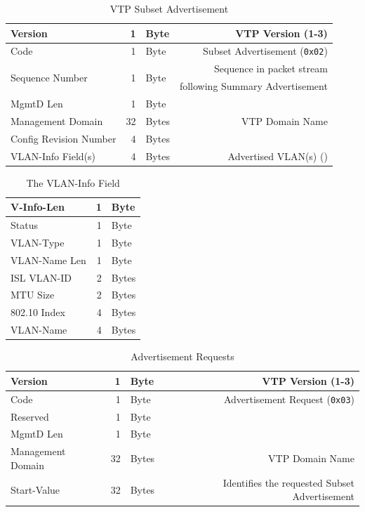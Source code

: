 \documentclass[12pt]{article}
\newcommand{\mr}[2]{\multirow{#1}{*}{#2}}
\begin{document}
	\begin{table}[H]
	\centering
	\caption{VTP Subset Advertisement \label{tab:VTP SUBSET}}
	\begin{tabular}{| l | r @{ } l | r |}\hline
	Version				& 1		& Byte		& VTP Version (1-3)\\\hline
	Code					& 1		& Byte		& Subset Advertisement (\texttt{0x02})\\\hline
	\mr{2}{Sequence Number}	& \mr{2}{1}	& \mr{2}{Byte}	& Sequence in packet stream\\
						&		&			& following Summary Advertisement\\\hline
	MgmtD Len				& 1		& Byte		&\\\hline
	Management Domain		& 32		& Bytes		& VTP Domain Name\\\hline
	Config Revision Number	& 4		& Bytes		&\\\hline
	VLAN-Info Field(s)		& 4		& Bytes		& Advertised VLAN(s) (\Cref{tab:VTP VLAN})\\\hline
	\end{tabular}\end{table}

	\begin{table}[H]
	\centering
	\caption{The VLAN-Info Field \label{tab:VTP VLAN}}
	\begin{tabular}{| l | r @{ } l |}\hline
	V-Info-Len				& 1	& Byte\\\hline
	Status				& 1	& Byte\\\hline
	VLAN-Type				& 1	& Byte\\\hline
	VLAN-Name Len			& 1	& Byte\\\hline
	ISL VLAN-ID			& 2	& Bytes\\\hline
	MTU Size				& 2	& Bytes\\\hline
	802.10 Index			& 4	& Bytes\\\hline
	VLAN-Name			& 4	& Bytes\\\hline
	\end{tabular}\end{table}

	\begin{table}[H]
	\centering
	\caption{Advertisement Requests \label{tab:VTP REQUEST}}
	\begin{tabular}{| l | r @{ } l | r |}\hline
	Version				& 1	& Byte	& VTP Version (1-3)\\\hline
	Code					& 1	& Byte	& Advertisement Request (\texttt{0x03})\\\hline
	Reserved				& 1	& Byte	&\\\hline
	MgmtD Len				& 1	& Byte	&\\\hline
	Management Domain		& 32	& Bytes	& VTP Domain Name\\\hline
	Start-Value				& 32	& Bytes	& Identifies the requested Subset Advertisement\\\hline
	\end{tabular}\end{table}
\end{document}
